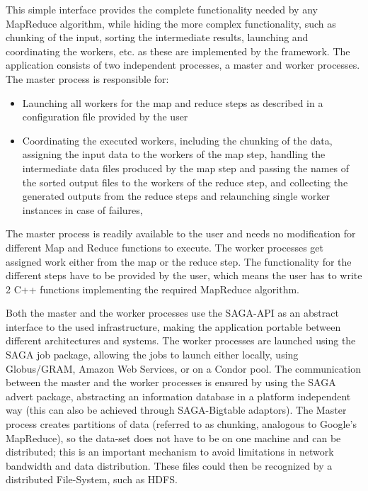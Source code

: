 \documentclass[3p,twocolumn]{elsarticle}
\begin{document}
This simple interface provides the complete functionality needed by
any MapReduce algorithm, while hiding the more complex functionality,
such as chunking of the input, sorting the intermediate results,
launching and coordinating the workers, etc. as these are implemented
by the framework.  The application consists of two independent
processes, a master and worker processes. The master process is
responsible for:

\begin{itemize}
\item Launching all workers for the map and reduce steps as described
  in a configuration file provided by the user 
\item Coordinating the executed workers, including the chunking of the
  data, assigning the input data to the workers of the map step,
  handling the intermediate data files produced by the map step and
  passing the names of the sorted output files to the workers of the
  reduce step, and collecting the generated outputs from the reduce
  steps and relaunching single worker instances in case of failures,
\end{itemize}

The master process is readily available to the user and needs no
modification for different Map and Reduce functions to execute.  The
worker processes get assigned work either from the map or the reduce
step. The functionality for the different steps have to be provided by
the user, which means the user has to write 2 C++ functions
implementing the required MapReduce algorithm.

Both the master and the worker processes use the SAGA-API as an
abstract interface to the used infrastructure, making the application
portable between different architectures and systems. The worker
processes are launched using the SAGA job package, allowing the jobs
to launch either locally, using Globus/GRAM, Amazon Web Services, or
on a Condor pool. The communication between the master and the worker
processes is ensured by using the SAGA advert package, abstracting an
information database in a platform independent way (this can also be
achieved through SAGA-Bigtable adaptors).  The Master process creates
partitions of data (referred to as chunking, analogous to Google's
MapReduce), so the data-set does not have to be on one machine and can
be distributed; this is an important mechanism to avoid limitations in
network bandwidth and data distribution.  These files could then be
recognized by a distributed File-System, such as HDFS. 
\end{document}
